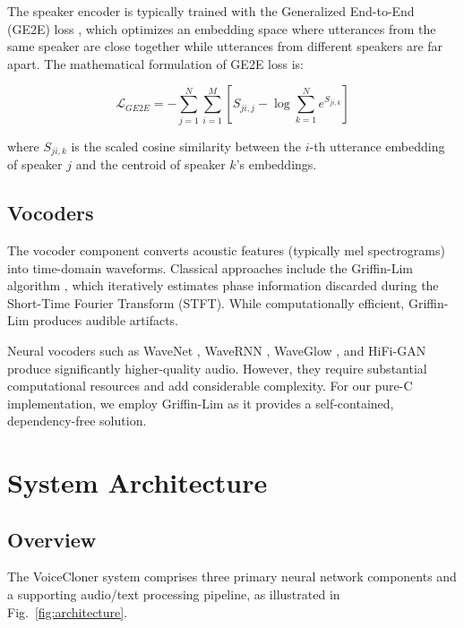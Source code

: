 \documentclass[conference]{IEEEtran}
\begin{document}
The speaker encoder is typically trained with the Generalized End-to-End (GE2E) loss \cite{wan2018generalized}, which optimizes an embedding space where utterances from the same speaker are close together while utterances from different speakers are far apart. The mathematical formulation of GE2E loss is:

\begin{equation}
\mathcal{L}_{GE2E} = -\sum_{j=1}^{N} \sum_{i=1}^{M} \left[ S_{ji,j} - \log \sum_{k=1}^{N} e^{S_{ji,k}} \right]
\label{eq:ge2e}
\end{equation}

where $S_{ji,k}$ is the scaled cosine similarity between the $i$-th utterance embedding of speaker $j$ and the centroid of speaker $k$'s embeddings.

\subsection{Vocoders}

The vocoder component converts acoustic features (typically mel spectrograms) into time-domain waveforms. Classical approaches include the Griffin-Lim algorithm \cite{griffin1984signal}, which iteratively estimates phase information discarded during the Short-Time Fourier Transform (STFT). While computationally efficient, Griffin-Lim produces audible artifacts.

Neural vocoders such as WaveNet \cite{oord2016wavenet}, WaveRNN \cite{kalchbrenner2018efficient}, WaveGlow \cite{prenger2019waveglow}, and HiFi-GAN \cite{kong2020hifigan} produce significantly higher-quality audio. However, they require substantial computational resources and add considerable complexity. For our pure-C implementation, we employ Griffin-Lim as it provides a self-contained, dependency-free solution.

\section{System Architecture}

\subsection{Overview}

The VoiceCloner system comprises three primary neural network components and a supporting audio/text processing pipeline, as illustrated in Fig.~\ref{fig:architecture}.
\end{document}
